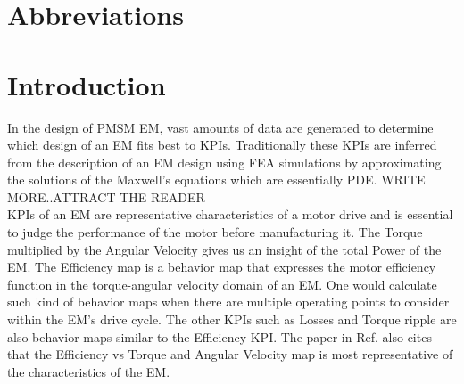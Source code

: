 \documentclass{report} %
\begin{document}
\begin{spacing}{1.2}
    \tableofcontents
\end{spacing}

\chapter*{Abbreviations}
\begin{acronym}[TDMA]
  

\end{acronym}

\newpage

\newpage

\chapter{Introduction} 
In the design of \ac{PMSM} \ac{EM}, vast amounts of data are generated to determine which design of an \ac{EM} fits best to \ac{KPI}s.
Traditionally these \ac{KPI}s are inferred from the description of an \ac{EM} design using \ac{FEA} simulations by approximating the solutions of the Maxwell's equations 
which are essentially \ac{PDE}.
WRITE MORE..ATTRACT THE READER \\

\ac{KPI}s of an \ac{EM} are representative characteristics of a motor drive and is essential to judge the performance of the motor before manufacturing it.
The Torque multiplied by the Angular Velocity gives us an insight of the total Power of the \ac{EM}.
The Efficiency map is a behavior map that expresses the motor efficiency function in the torque-angular velocity domain of an \ac{EM}.
One would calculate such kind of behavior maps when there are multiple operating points to consider within the \ac{EM}'s drive cycle.
The other \ac{KPI}s such as Losses and Torque ripple are also behavior maps similar to the Efficiency \ac{KPI}.
The paper in Ref. \cite{ETA-2021} also cites that the Efficiency vs Torque and Angular Velocity map is most representative of the characteristics of the \ac{EM}.  \\
\end{document}
